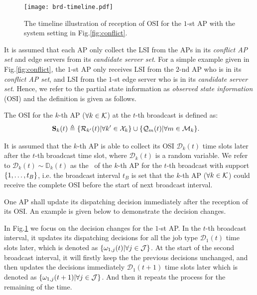 \begin{figure}[t]
    \centering
    \texttt{[image: brd-timeline.pdf]}
    \caption{The timeline illustration of reception of OSI for the $1$-st AP with the system setting in Fig.\ref{fig:conflict}.}
    \label{fig:brd-timeline}
\end{figure}

It is assumed that each AP only collect the LSI from the APs in its \emph{conflict AP set} and edge servers from its \emph{candidate server set}.
For a simple example given in Fig.\ref{fig:conflict}, the $1$-st AP only receives LSI from the $2$-nd AP who is in its \emph{conflict AP set}, and LSI from the $1$-st edge server who is in its \emph{candidate server set}.
Hence, we refer to the partial state information as \emph{observed state information} (OSI) and the definition is given as follows.
\begin{definition}
    The OSI for the $k$-th AP ($\forall k\in\mathcal{K}$) at the $t$-th broadcast is defined as:
    \begin{align}
        \mathbf{S}_{k}(t) &\triangleq \{\mathcal{R}_{k'}(t) | \forall k'\in\mathcal{X}_{k}\}
                         \cup \{\mathcal{Q}_{m}(t) | \forall m\in\mathcal{M}_{k}\}.
        \label{def:OSI}
    \end{align}
\end{definition}

It is assumed that the $k$-th AP is able to collect its OSI $\mathcal{D}_{k}(t)$ time slots later after the $t$-th broadcast time slot, where $\mathcal{D}_{k}(t)$ is a random variable.
We refer to $\mathcal{D}_{k}(t) \sim \mathbb{D}_{k}(t)$ as the \brlatency~of the $k$-th AP for the $t$-th broadcast with support $\{1,\dots,t_B\}$, i.e. the broadcast interval $t_B$ is set that the $k$-th AP ($\forall k\in\mathcal{K}$) could receive the complete OSI before the start of next broadcast interval.

One AP shall update its dispatching decision immediately after the reception of its OSI.
An example is given below to demonstrate the decision changes.
\begin{example}
    In Fig.\ref{fig:brd-timeline} we focus on the decision changes for the $1$-st AP.
    In the $t$-th broadcast interval, it updates its dispatching decisions for all the job type $\mathcal{D}_{1}(t)$ time slots later, which is denoted as $\{\omega_{1,j}(t) | \forall j\in\mathcal{J}\}$.
    At the start of the second broadcast interval, it will firstly keep the the previous decisions unchanged, and then updates the decisions immediately $\mathcal{D}_{1}(t+1)$ time slots later which is denoted as $\{\omega_{1,j}(t+1) | \forall j\in\mathcal{J}\}$.
    And then it repeats the process for the remaining of the time.
\end{example}

